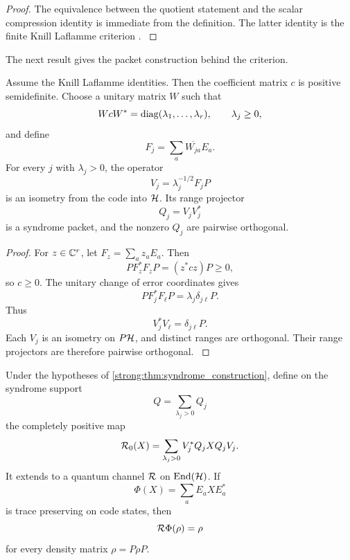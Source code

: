 \begin{proof}\label{strong:proof:039}
The equivalence between the quotient statement and the scalar compression identity is immediate from the definition. The latter identity is the finite Knill Laflamme criterion \cite{KnillLaflamme1997,SchumacherNielsen1996}.
\label{strong:proof:039:end}\end{proof}

The next result gives the packet construction behind the criterion.

\begin{theorem}\label{strong:theorem:027}\label{strong:thm:syndrome_construction}
Assume the Knill Laflamme identities. Then the coefficient matrix \(c\) is positive semidefinite. Choose a unitary matrix \(W\) such that
\[
WcW^*=\operatorname{diag}(\lambda_1,\ldots,\lambda_r),
\qquad
\lambda_j\geq0,
\]
and define
\[
F_j=\sum_a\overline{W_{ja}}E_a.
\]
For every \(j\) with \(\lambda_j>0\), the operator
\[
V_j=\lambda_j^{-1/2}F_jP
\]
is an isometry from the code into \(\mathcal H\). Its range projector
\[
Q_j=V_jV_j^*
\]
is a syndrome packet, and the nonzero \(Q_j\) are pairwise orthogonal.
\end{theorem}

\begin{proof}\label{strong:proof:040}
For \(z\in\mathbb C^r\), let \(F_z=\sum_az_aE_a\). Then
\[
PF_z^*F_zP=(z^*cz)P\geq0,
\]
so \(c\geq0\). The unitary change of error coordinates gives
\[
PF_j^*F_\ell P
=
\lambda_j\delta_{j\ell}P.
\]
Thus
\[
V_j^*V_\ell=\delta_{j\ell}P.
\]
Each \(V_j\) is an isometry on \(P\mathcal H\), and distinct ranges are orthogonal. Their range projectors are therefore pairwise orthogonal.
\label{strong:proof:040:end}\end{proof}

\begin{theorem}\label{strong:theorem:028}\label{strong:thm:exact_recovery}
Under the hypotheses of \cref{strong:thm:syndrome_construction}, define on the syndrome support
\[
Q=\sum_{\lambda_j>0}Q_j
\]
the completely positive map
\[
\mathcal R_0(X)
=
\sum_{\lambda_j>0}
V_j^*Q_jXQ_jV_j.
\]
It extends to a quantum channel \(\mathcal R\) on \(\operatorname{End}(\mathcal H)\). If
\[
\Phi(X)=\sum_aE_aXE_a^*
\]
is trace preserving on code states, then
\[
\mathcal R\Phi(\rho)=\rho
\]
for every density matrix \(\rho=P\rho P\).
\end{theorem}

